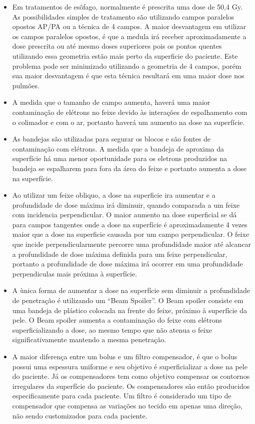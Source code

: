 \documentclass[11pt,a4paper]{article}
\newcounter{exemplo}
\begin{document}
\begin{exemplo}
\begin{itemize}
        \item Em tratamentos de esôfago, normalmente é prescrita uma dose de 50,4 Gy. As possibilidades simples de tratamento são utilizando campos paralelos opostos AP/PA ou a técnica de 4 campos. A maior desvantagem em utilizar os campos paralelos opostos, é que a medula irá receber aproximadamente a dose prescrita ou até mesmo doses superiores pois os pontos quentes utilizando essa geometria estão mais perto da superficie do paciente. Este problema pode ser minimizado utilizando a geometria de 4 campos, porém sua maior desvantagem é que esta técnica resultará em uma maior dose nos pulmões. 
        
        \item A medida que o tamanho de campo aumenta, haverá uma maior contaminação de elétrons no feixe devido às interações de espalhamento com o colimador e com o ar, portanto haverá um aumento na dose na superfície. 

        \item As bandejas são utilizadas para segurar os blocos e são fontes de contaminação com elétrons. A medida que a bandeja de aproxima da superfície há uma menor oportunidade para os eletrons produzidos na bandeja se espalharem para fora da área do feixe e portanto aumenta a dose na superfície.
        
        \item Ao utilizar um feixe obliquo, a dose na superficie ira aumentar e a profundidade de dose máxima irá diminuir, quando comparada a um feixe com incidencia perpendicular. O maior aumento na dose superficial se dá para campos tangentes onde a dose na superfície é aproximadamente 4 vezes maior que a dose na superficie causada por um campo perpendicular. O feixe que incide perpendicularmente percorre uma profundidade maior até alcancar a profundidade de dose máxima definida para um feixe perpendicular, portanto a profundidade de dose máxima irá ocorrer em uma profundidade perpendiculas mais próxima à superfície. 

        \item A ùnica forma de aumentar a dose na superfície sem diminuir a profundidade de penetração é utilizando um ``Beam Spoiler''. O Beam spoiler consiste em uma bandeja de plástico colocada na frente do feixe, próximo à superfície da pele. O Beam spoiler aumenta a contaminação do feixe com elétrons superficializando a dose, ao mesmo tempo que não atenua o feixe significativamente mantendo a mesma penetração.
        
        \item A maior diferença entre um bolus e um filtro compensador, é que o bolus possui uma espessura uniforme e seu objetivo é superficializar a dose na pele do paciente. Já os compensadores tem como objetivo compensar os contornos irregulares da superfície do paciente. Os compensadores são então producidos especificamente para cada paciente. Um filtro é considerado um tipo de compensador que compensa as variações no tecido em apenas uma direção, não sendo customizados para cada paciente. 
    \end{itemize}
\end{exemplo}



\end{document}
